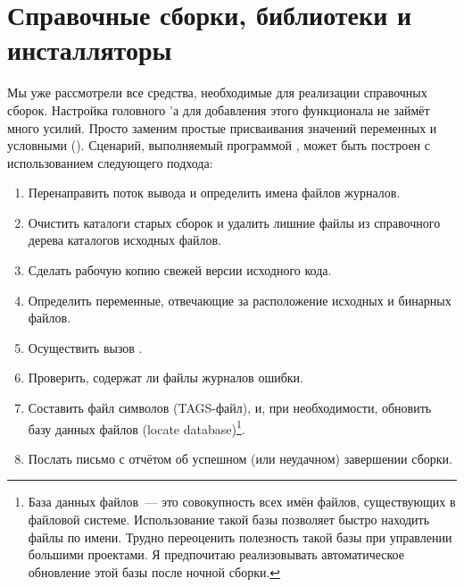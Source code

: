 \section{Справочные сборки, библиотеки и инсталляторы}

Мы уже рассмотрели все средства, необходимые для реализации справочных
сборок. Настройка головного \Makefile{}'а для добавления этого
функционала не займёт много усилий. Просто заменим простые
присваивания значений переменных  и
 условными (). Сценарий,
выполняемый программой , может быть построен с
использованием следующего подхода:

\begin{enumerate}
\item Перенаправить поток вывода и определить имена файлов журналов.
\item Очистить каталоги старых сборок и удалить лишние файлы из
справочного дерева каталогов исходных файлов.
\item Сделать рабочую копию свежей версии исходного кода.
\item Определить переменные, отвечающие за расположение исходных и
бинарных файлов.
\item Осуществить вызов \GNUmake{}.
\item Проверить, содержат ли файлы журналов ошибки.
\item Составить файл символов (TAGS-файл), и, при необходимости,
 
обновить базу данных файлов (locate database)\footnote{
База данных файлов~--- это совокупность всех имён файлов, существующих
в файловой системе. Использование такой базы позволяет быстро находить
файлы по имени. Трудно переоценить полезность такой базы при
управлении большими проектами. Я предпочитаю реализовывать
автоматическое обновление этой базы после ночной сборки.}.
\item Послать письмо с отчётом об успешном (или неудачном) завершении
сборки.
\end{enumerate}


